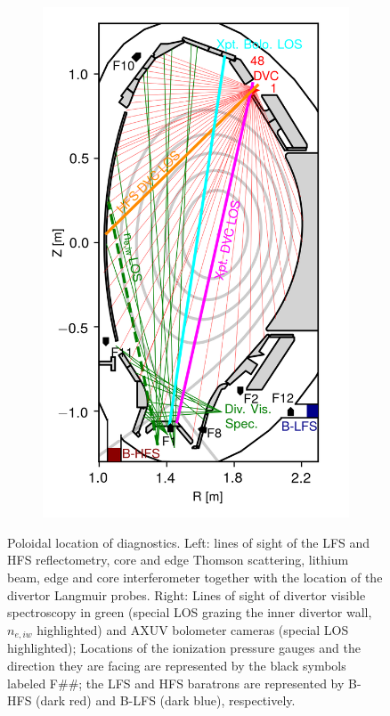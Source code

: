 \documentclass[12pt]{iopart}
\begin{document}
\begin{figure}[!hbt]
\begin{subfigure}{3in}
	\caption*{}
	\end{subfigure}
	~
	\begin{subfigure}{3in}
    \includegraphics{probes_spectrometers.png}
	\caption*{}
	\end{subfigure}
	\caption{Poloidal location of diagnostics. Left: lines of sight of the LFS and HFS reflectometry, core and edge Thomson scattering, lithium beam, edge and core interferometer together with the location of the divertor Langmuir probes. Right: Lines of sight of divertor visible spectroscopy in green (special LOS grazing the inner divertor wall, $n_{e,iw}$ highlighted) and AXUV bolometer cameras (special LOS highlighted); Locations of the ionization pressure gauges and the direction they are facing are represented by the black symbols labeled F\#\#; the LFS and HFS baratrons are represented by B-HFS (dark red) and B-LFS (dark blue), respectively.}
    \label{fig:diag_distribution}
\end{figure}
\end{document}
